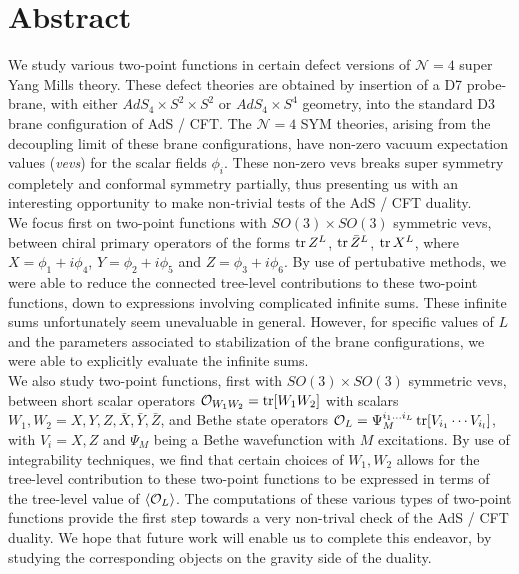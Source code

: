 %
\thispagestyle{empty}
%
%
\section*{Abstract}
We study various two-point functions in certain defect versions of $\mathcal{N} = 4$ super Yang Mills theory. These defect theories are obtained by insertion of a D7 probe-brane, with either $AdS_4 \times S^2 \times S^2$ or $AdS_4 \times S^4$ geometry, into the standard D3 brane configuration of AdS / CFT. The $\mathcal{N} = 4$ SYM theories, arising from the decoupling limit of these brane configurations, have non-zero vacuum expectation values (\textit{vevs}) for the scalar fields $\phi_i$. These non-zero vevs breaks super symmetry completely and conformal symmetry partially, thus presenting us with an interesting opportunity to make non-trivial tests of the AdS / CFT duality.\\
We focus first on two-point functions with $SO(3) \times SO(3)$ symmetric vevs, between chiral primary operators of the forms $\tr Z^L$, $\tr \bar{Z}^L$, $\tr X^L$, where $X = \phi_1 + i \phi_4$, $Y = \phi_2 + i \phi_5$ and $Z = \phi_3 + i \phi_6$. By use of pertubative methods, we were able to reduce the connected tree-level contributions to these two-point functions, down to expressions involving complicated infinite sums. These infinite sums unfortunately seem unevaluable in general. However, for specific values of $L$ and the parameters associated to stabilization of the brane configurations, we were able to explicitly evaluate the infinite sums.\\
We also study two-point functions, first with $SO(3) \times SO(3)$ symmetric vevs, between short scalar operators $\mathcal{O}_{W_1 W_2} = \tr[W_1 W_2]$ with scalars $W_1,W_2 = X,Y,Z, \bar{X}, \bar{Y}, \bar{Z}$, and Bethe state operators $\mathcal{O}_{L} = \Psi_M^{i_1 \ldots i_L} \tr[V_{i_1} \cdots V_{i_l}]$, with $V_i = X,Z$ and $\Psi_M$ being a Bethe wavefunction with $M$ excitations. By use of integrability techniques, we find that certain choices of $W_1,W_2$ allows for the tree-level contribution to these two-point functions to be expressed in terms of the tree-level value of $\expval{\mathcal{O}_{L}}$. The computations of these various types of two-point functions provide the first step towards a very non-trival check of the AdS / CFT duality. We hope that future work will enable us to complete this endeavor, by studying the corresponding objects on the gravity side of the duality. 

